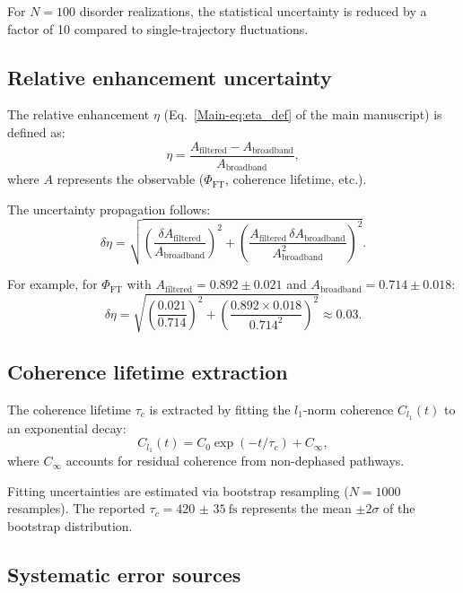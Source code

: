 \documentclass[11pt,a4paper]{article}
\begin{document}
For $N = 100$ disorder realizations, the statistical uncertainty is reduced by a factor of 10 compared to single-trajectory fluctuations.

\subsection{Relative enhancement uncertainty}

The relative enhancement $\eta$ (Eq.~\cref{Main-eq:eta_def} of the main manuscript) is defined as:
\begin{equation}
\eta = \frac{A_{\mathrm{filtered}} - A_{\mathrm{broadband}}}{A_{\mathrm{broadband}}},
\end{equation}
where $A$ represents the observable ($\Phi_{\mathrm{FT}}$, coherence lifetime, etc.).

The uncertainty propagation follows:
\begin{equation}
\delta\eta = \sqrt{\left(\frac{\delta A_{\mathrm{filtered}}}{A_{\mathrm{broadband}}}\right)^2 + \left(\frac{A_{\mathrm{filtered}} \, \delta A_{\mathrm{broadband}}}{A_{\mathrm{broadband}}^2}\right)^2}.
\label{eq:error_propagation}
\end{equation}

For example, for $\Phi_{\mathrm{FT}}$ with $A_{\mathrm{filtered}} = 0.892 \pm 0.021$ and $A_{\mathrm{broadband}} = 0.714 \pm 0.018$:
\begin{equation}
\delta\eta = \sqrt{\left(\frac{0.021}{0.714}\right)^2 + \left(\frac{0.892 \times 0.018}{0.714^2}\right)^2} \approx 0.03.
\end{equation}

\subsection{Coherence lifetime extraction}

The coherence lifetime $\tau_c$ is extracted by fitting the $l_1$-norm coherence $C_{l_1}(t)$ to an exponential decay:
\begin{equation}
C_{l_1}(t) = C_0 \exp(-t/\tau_c) + C_{\infty},
\label{eq:coherence_fit}
\end{equation}
where $C_{\infty}$ accounts for residual coherence from non-dephased pathways.

Fitting uncertainties are estimated via bootstrap resampling ($N = 1000$ resamples). The reported $\tau_c = \SI{420(35)}{\femto\second}$ represents the mean $\pm 2\sigma$ of the bootstrap distribution.

\subsection{Systematic error sources}
\end{document}
